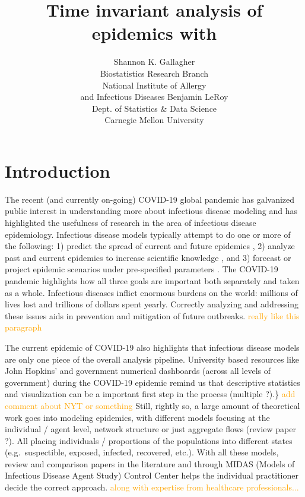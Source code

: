 \documentclass[
  shortnames]{jss}
\author{
Shannon K. Gallagher\\Biostatistics Research Branch\\
National Institute of Allergy\\
and Infectious Diseases \And Benjamin LeRoy\\Dept. of Statistics \& Data
Science\\
Carnegie Mellon University
}
\title{Time invariant analysis of epidemics with \pkg{EpiCompare}}
\begin{document}
\newcommand{\shannon}[1]{\textcolor{orange}{#1}}
\newcommand{\ben}[1]{\textcolor{violet}{#1}}

\newtheorem{theorem}{Theorem}

\section[Intro]{Introduction}\label{sec:intro}

The recent (and currently on-going) COVID-19 global pandemic has
galvanized public interest in understanding more about infectious
disease modeling and has highlighted the usefulness of research in the
area of infectious disease epidemiology. Infectious disease models
typically attempt to do one or more of the following: 1) predict the
spread of current and future epidemics
\citep[e.g. flue prediction][]{Biggerstaff2016}, 2) analyze past and
current epidemics to increase scientific knowledge
\citep[e.g. historical measle outbreaks][]{Neal2004}, and 3) forecast or
project epidemic scenarios under pre-specified parameters
\citep[e.g. ...][]{}. The COVID-19 pandemic highlights how all three
goals are important both separately and taken as a whole. Infectious
diseases inflict enormous burdens on the world: millions of lives lost
and trillions of dollars spent yearly. Correctly analyzing and
addressing these issues aids in prevention and mitigation of future
outbreaks. \textcolor{orange}{really like this paragraph}

The current epidemic of COVID-19 also highlights that infectious disease
models are only one piece of the overall analysis pipeline. University
based resources like John Hopkins' and government numerical dashboards
(across all levels of government) during the COVID-19 epidemic remind us
that descriptive statistics and visualization can be a important first
step in the process (multiple \cite{}?).\}
\textcolor{orange}{add comment about NYT or something} Still, rightly
so, a large amount of theoretical work goes into modeling epidemics,
with different models focusing at the individual / agent level, network
structure or just aggregate flows (review paper \cite{}?). All placing
individuals / proportions of the populations into different states
(e.g.~suspectible, exposed, infected, recovered, etc.). With all these
models, review and comparison papers in the literature and through MIDAS
(Models of Infectious Disease Agent Study) Control Center helps the
individual practitioner decide the correct approach.
\textcolor{orange}{along with expertise from healthcare professionals...}
\end{document}
